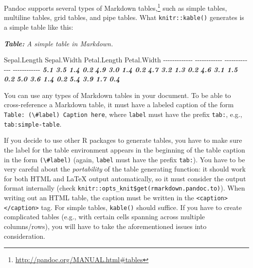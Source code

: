 \documentclass[
  12pt,
]{krantz}
\newenvironment{Shaded}{\begin{snugshade}}{\end{snugshade}}
\newcommand{\AnnotationTok}[1]{\textcolor[rgb]{0.56,0.35,0.01}{\textbf{\textit{#1}}}}
\newcommand{\CommentTok}[1]{\textcolor[rgb]{0.56,0.35,0.01}{\textit{#1}}}
\newcommand{\InformationTok}[1]{\textcolor[rgb]{0.56,0.35,0.01}{\textbf{\textit{#1}}}}
\newcommand{\NormalTok}[1]{#1}
\renewcommand{\href}[2]{#2\footnote{\url{#1}}}
\theoremstyle{definition}
\theoremstyle{definition}
\theoremstyle{definition}
\theoremstyle{definition}
\theoremstyle{remark}
\begin{document}
Pandoc supports several types of \href{http://pandoc.org/MANUAL.html\#tables}{Markdown tables,} such as simple tables, multiline tables, grid tables, and pipe tables. What \texttt{knitr::kable()} generates is a simple table like this:

\begin{Shaded}
\begin{Highlighting}[]
\AnnotationTok{Table:}\CommentTok{ A simple table in Markdown.}

\NormalTok{ Sepal.Length   Sepal.Width   Petal.Length   Petal.Width}
\NormalTok{{-}{-}{-}{-}{-}{-}{-}{-}{-}{-}{-}{-}{-}  {-}{-}{-}{-}{-}{-}{-}{-}{-}{-}{-}{-}  {-}{-}{-}{-}{-}{-}{-}{-}{-}{-}{-}{-}{-}  {-}{-}{-}{-}{-}{-}{-}{-}{-}{-}{-}{-}}
\InformationTok{          5.1           3.5            1.4           0.2}
\InformationTok{          4.9           3.0            1.4           0.2}
\InformationTok{          4.7           3.2            1.3           0.2}
\InformationTok{          4.6           3.1            1.5           0.2}
\InformationTok{          5.0           3.6            1.4           0.2}
\InformationTok{          5.4           3.9            1.7           0.4}
\end{Highlighting}
\end{Shaded}

You can use any types of Markdown tables in your document. To be able to cross-reference a Markdown table, it must have a labeled caption of the form \texttt{Table:\ (\textbackslash{}\#label)\ Caption\ here}, where \texttt{label} must have the prefix \texttt{tab:}, e.g., \texttt{tab:simple-table}.

If you decide to use other R packages to generate tables, you have to make sure the label for the table environment appears in the beginning of the table caption in the form \texttt{(\textbackslash{}\#label)} (again, \texttt{label} must have the prefix \texttt{tab:}). You have to be very careful about the \emph{portability} of the table generating function: it should work for both HTML and LaTeX output automatically, so it must consider the output format internally (check \texttt{knitr::opts\_knit\$get(\textquotesingle{}rmarkdown.pandoc.to\textquotesingle{})}). When writing out an HTML table, the caption must be written in the \texttt{\textless{}caption\textgreater{}\textless{}/caption\textgreater{}} tag. For simple tables, \texttt{kable()} should suffice. If you have to create complicated tables (e.g., with certain cells spanning across multiple columns/rows), you will have to take the aforementioned issues into consideration.
\end{document}
